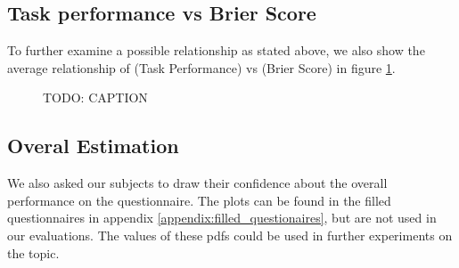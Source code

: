 \documentclass[../main/main.tex]{subfiles}
\begin{document}
\subsection{Task performance vs Brier Score}
To further examine a possible relationship as stated above, we also show the average relationship of (Task Performance) vs (Brier Score) in figure \ref{fig:tp_vs_bs}.
\begin{figure}[h]
	\centering
	\captionsetup{justification=centering}
	\caption{TODO: CAPTION}
	\label{fig:tp_vs_bs} 
\end{figure}
\subsection{Overal Estimation}
We also asked our subjects to draw their confidence about the overall performance on the questionnaire. The plots can be found in the filled questionnaires in appendix \ref{appendix:filled_questionaires}, but are not used in our evaluations. The values of these pdfs could be used in further experiments on the topic.
\end{document}
